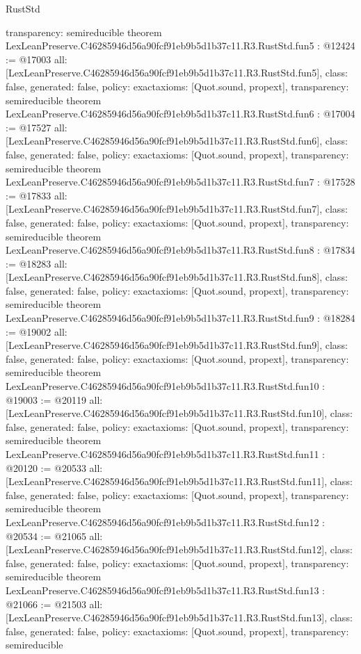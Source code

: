 \begin{lexlean}{RustStd}
\begin{coremodule}
{  transparency: semireducible
}
theorem LexLeanPreserve.C46285946d56a90fcf91eb9b5d1b37c11.R3.RustStd.fun5 : @12424 := @17003 {
  all: [LexLeanPreserve.C46285946d56a90fcf91eb9b5d1b37c11.R3.RustStd.fun5],
  class: false,
  generated: false,
  policy: exact{axioms: [Quot.sound, propext]},
  transparency: semireducible
}
theorem LexLeanPreserve.C46285946d56a90fcf91eb9b5d1b37c11.R3.RustStd.fun6 : @17004 := @17527 {
  all: [LexLeanPreserve.C46285946d56a90fcf91eb9b5d1b37c11.R3.RustStd.fun6],
  class: false,
  generated: false,
  policy: exact{axioms: [Quot.sound, propext]},
  transparency: semireducible
}
theorem LexLeanPreserve.C46285946d56a90fcf91eb9b5d1b37c11.R3.RustStd.fun7 : @17528 := @17833 {
  all: [LexLeanPreserve.C46285946d56a90fcf91eb9b5d1b37c11.R3.RustStd.fun7],
  class: false,
  generated: false,
  policy: exact{axioms: [Quot.sound, propext]},
  transparency: semireducible
}
theorem LexLeanPreserve.C46285946d56a90fcf91eb9b5d1b37c11.R3.RustStd.fun8 : @17834 := @18283 {
  all: [LexLeanPreserve.C46285946d56a90fcf91eb9b5d1b37c11.R3.RustStd.fun8],
  class: false,
  generated: false,
  policy: exact{axioms: [Quot.sound, propext]},
  transparency: semireducible
}
theorem LexLeanPreserve.C46285946d56a90fcf91eb9b5d1b37c11.R3.RustStd.fun9 : @18284 := @19002 {
  all: [LexLeanPreserve.C46285946d56a90fcf91eb9b5d1b37c11.R3.RustStd.fun9],
  class: false,
  generated: false,
  policy: exact{axioms: [Quot.sound, propext]},
  transparency: semireducible
}
theorem LexLeanPreserve.C46285946d56a90fcf91eb9b5d1b37c11.R3.RustStd.fun10 : @19003 := @20119 {
  all: [LexLeanPreserve.C46285946d56a90fcf91eb9b5d1b37c11.R3.RustStd.fun10],
  class: false,
  generated: false,
  policy: exact{axioms: [Quot.sound, propext]},
  transparency: semireducible
}
theorem LexLeanPreserve.C46285946d56a90fcf91eb9b5d1b37c11.R3.RustStd.fun11 : @20120 := @20533 {
  all: [LexLeanPreserve.C46285946d56a90fcf91eb9b5d1b37c11.R3.RustStd.fun11],
  class: false,
  generated: false,
  policy: exact{axioms: [Quot.sound, propext]},
  transparency: semireducible
}
theorem LexLeanPreserve.C46285946d56a90fcf91eb9b5d1b37c11.R3.RustStd.fun12 : @20534 := @21065 {
  all: [LexLeanPreserve.C46285946d56a90fcf91eb9b5d1b37c11.R3.RustStd.fun12],
  class: false,
  generated: false,
  policy: exact{axioms: [Quot.sound, propext]},
  transparency: semireducible
}
theorem LexLeanPreserve.C46285946d56a90fcf91eb9b5d1b37c11.R3.RustStd.fun13 : @21066 := @21503 {
  all: [LexLeanPreserve.C46285946d56a90fcf91eb9b5d1b37c11.R3.RustStd.fun13],
  class: false,
  generated: false,
  policy: exact{axioms: [Quot.sound, propext]},
  transparency: semireducible
}
\end{coremodule}
\end{lexlean}
